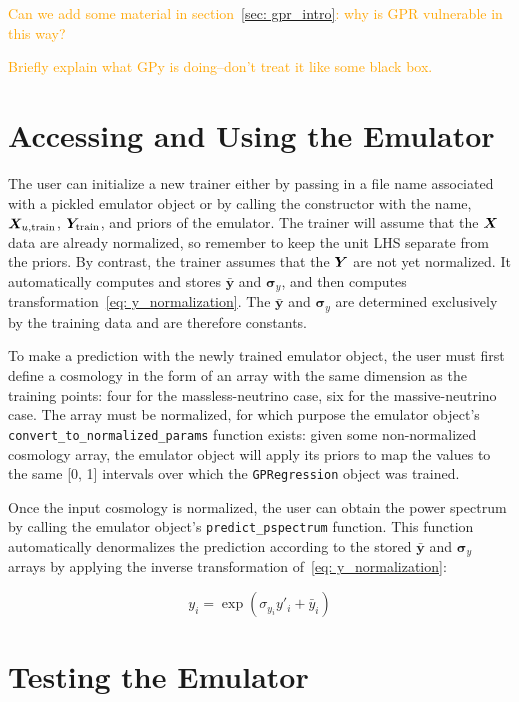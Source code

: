 \textcolor{orange}{Can we add some material in
section~\ref{sec: gpr_intro}: why is GPR vulnerable in this way?}

\textcolor{orange}{Briefly explain what GPy is doing--don’t treat it like some 
black box.}


\section{Accessing and Using the Emulator}

The user can initialize a new trainer either by
passing in a file name associated with a pickled emulator object or by
calling the constructor with the name, $\bm{X}_{u, \text{train}}$,
$\bm{Y}_\text{train}$, and priors of the emulator. The trainer will assume
that the $\bm{X}$ data are already normalized, so remember to keep the unit
LHS separate from the priors. By contrast, the trainer assumes that the
$\bm{Y}$ are not yet normalized. It automatically computes and stores
$\bar{\bm{y}}$ and $\bm{\sigma}_y$, and then computes
transformation~\ref{eq: y_normalization}.
The $\bar{\bm{y}}$ and $\bm{\sigma}_y$ are determined exclusively by the
training data and are therefore constants.

To make a prediction with the newly trained emulator object, the user must
first define a cosmology in the form of an array with the same dimension as 
the training points: four for the massless-neutrino case, six for the
massive-neutrino case. The array must be normalized, for which purpose the
emulator object's \verb|convert_to_normalized_params| function exists:
given some non-normalized cosmology array, the emulator object will apply its
priors to map the values to the same [0, 1] intervals over which the
\texttt{GPRegression} object was trained.

Once the input cosmology is normalized, the user can obtain the power
spectrum by calling the emulator object's \verb|predict_pspectrum| function.
This function automatically denormalizes the prediction according to the
stored $\bar{\bm{y}}$ and $\bm{\sigma}_y$ arrays by applying the inverse
transformation of~\ref{eq: y_normalization}:

\begin{equation}
y_i = \exp (\sigma_{y_i} y'_i + \bar{y}_i)
\end{equation}


\section{Testing the Emulator}
\label{test_emu}


